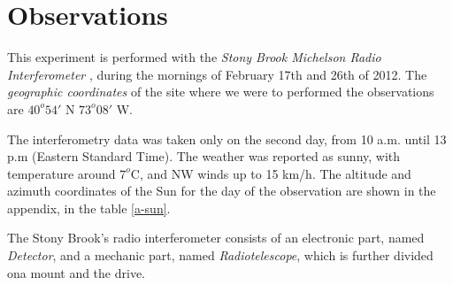 \section{Observations}

This experiment is performed with the {\it Stony Brook Michelson Radio Interferometer} \cite{sbu},  during the mornings of February 17th and 26th of 2012. The {\it geographic coordinates} of the site  where we were to performed the observations are  $40^o 54'$ N  $73^o 08'$ W. 

The interferometry data was taken only on the second day, from 10 a.m. until 13 p.m (Eastern Standard Time). The weather was reported as sunny, with temperature around $7^o$C, and NW winds up to 15 km/h. The altitude and azimuth coordinates of the Sun for the day of the observation are shown  in the appendix, in the table \ref{a-sun}.



The Stony Brook's radio interferometer consists of an electronic part, named {\it Detector}, and a mechanic  part, named {\it Radiotelescope}, which is further divided ona mount and  the drive. 




\bigskip

